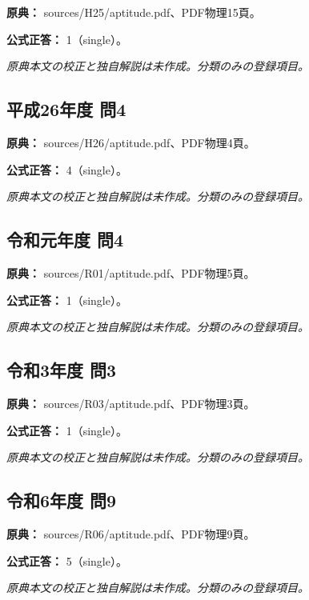 \noindent\textbf{原典：} sources/H25/aptitude.pdf、PDF物理15頁。

\textbf{公式正答：} 1（single）。

\par\textit{原典本文の校正と独自解説は未作成。分類のみの登録項目。}

\subsection{平成26年度 問4}
\label{q:h26-reg-apt-04}

\noindent\textbf{原典：} sources/H26/aptitude.pdf、PDF物理4頁。

\textbf{公式正答：} 4（single）。

\par\textit{原典本文の校正と独自解説は未作成。分類のみの登録項目。}

\subsection{令和元年度 問4}
\label{q:r01-reg-apt-04}

\noindent\textbf{原典：} sources/R01/aptitude.pdf、PDF物理5頁。

\textbf{公式正答：} 1（single）。

\par\textit{原典本文の校正と独自解説は未作成。分類のみの登録項目。}

\subsection{令和3年度 問3}
\label{q:r03-reg-apt-03}

\noindent\textbf{原典：} sources/R03/aptitude.pdf、PDF物理3頁。

\textbf{公式正答：} 1（single）。

\par\textit{原典本文の校正と独自解説は未作成。分類のみの登録項目。}

\subsection{令和6年度 問9}
\label{q:r06-reg-apt-09}

\noindent\textbf{原典：} sources/R06/aptitude.pdf、PDF物理9頁。

\textbf{公式正答：} 5（single）。

\par\textit{原典本文の校正と独自解説は未作成。分類のみの登録項目。}

